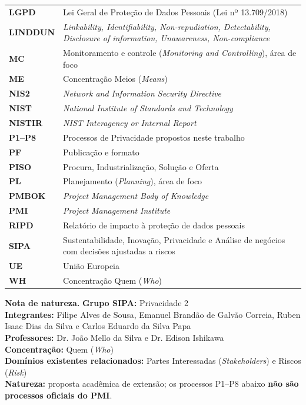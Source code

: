 \documentclass[11pt,a4paper]{article}
\newcommand{\SingleSpacing}{}
\newcommand{\onelineskip}{\baselineskip}
\begin{document}
\begin{longtable}{@{}>{\raggedright\arraybackslash}p{2.6cm}>{\raggedright\arraybackslash}p{\dimexpr\linewidth-2.6cm-2\tabcolsep\relax}@{}}
\textbf{LGPD} & Lei Geral de Proteção de Dados Pessoais (Lei nº 13.709/2018)\\[2pt]
\textbf{LINDDUN} & \textit{Linkability, Identifiability, Non-repudiation, Detectability, Disclosure of information, Unawareness, Non-compliance}\\[2pt]
\textbf{MC} & Monitoramento e controle (\textit{Monitoring and Controlling}), área de foco\\[2pt]
\textbf{ME} & Concentração Meios (\textit{Means})\\[2pt]
\textbf{NIS2} & \textit{Network and Information Security Directive}\\[2pt]
\textbf{NIST} & \textit{National Institute of Standards and Technology}\\[2pt]
\textbf{NISTIR} & \textit{NIST Interagency or Internal Report}\\[2pt]
\textbf{P1--P8} & Processos de Privacidade propostos neste trabalho\\[2pt]
\textbf{PF} & Publicação e formato\\[2pt]
\textbf{PISO} & Procura, Industrialização, Solução e Oferta\\[2pt]
\textbf{PL} & Planejamento (\textit{Planning}), área de foco\\[2pt]
\textbf{PMBOK} & \textit{Project Management Body of Knowledge}\\[2pt]
\textbf{PMI} & \textit{Project Management Institute}\\[2pt]
\textbf{RIPD} & Relatório de impacto à proteção de dados pessoais\\[2pt]
\textbf{SIPA} & Sustentabilidade, Inovação, Privacidade e Análise de negócios com decisões ajustadas a riscos\\[2pt]
\textbf{UE} & União Europeia\\[2pt]
\textbf{WH} & Concentração Quem (\textit{Who})\\[2pt]
\end{longtable}
\endgroup
\clearpage

\tableofcontents
\bigskip
\listoffigures
\bigskip
\listoftables
\clearpage
{}
\setcounter{table}{0}

\begin{flushleft}\small\SingleSpacing
\noindent\textbf{Nota de natureza.} \textbf{Grupo SIPA:} Privacidade 2\\ \textbf{Integrantes:} Filipe Alves de Sousa, Emanuel Brandão de Galvão Correia, Ruben Isaac Dias da Silva e Carlos Eduardo da Silva Papa\\ \textbf{Professores:} Dr. João Mello da Silva e Dr. Edison Ishikawa\\ \textbf{Concentração:} Quem (\textit{Who})\\ \textbf{Domínios existentes relacionados:} Partes Interessadas (\textit{Stakeholders}) e Riscos (\textit{Risk})\\ \textbf{Natureza:} proposta acadêmica de extensão; os processos P1–P8 abaixo \textbf{não são processos oficiais do PMI}.
\end{flushleft}
\vspace{\onelineskip}
\end{document}
